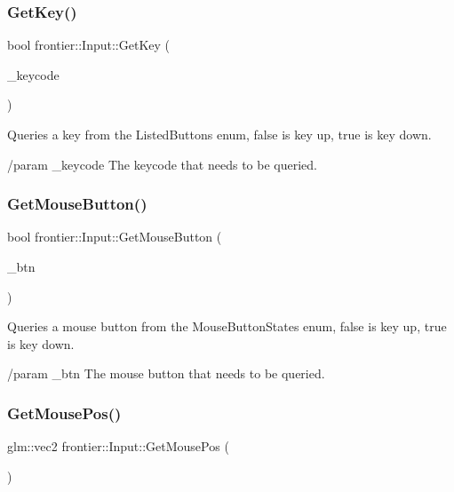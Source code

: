 \subsubsection{\texorpdfstring{Get\+Key()}{GetKey()}}
{\footnotesize\ttfamily bool frontier\+::\+Input\+::\+Get\+Key (\begin{DoxyParamCaption}\item[{\hyperlink{classfrontier_1_1_input_ada5b6b09af9c827bacee6fbc69015096}{Listed\+Buttons}}]{\+\_\+keycode }\end{DoxyParamCaption})}



Queries a key from the Listed\+Buttons enum, false is key up, true is key down. 

/param \+\_\+keycode The keycode that needs to be queried. \mbox{\label{classfrontier_1_1_input_ab7b944042e2bf83992b8347ea89a08c6}} 
\subsubsection{\texorpdfstring{Get\+Mouse\+Button()}{GetMouseButton()}}
{\footnotesize\ttfamily bool frontier\+::\+Input\+::\+Get\+Mouse\+Button (\begin{DoxyParamCaption}\item[{\hyperlink{classfrontier_1_1_input_ae78744e8c0799230bc6533be5d4b40f7}{Mouse\+Button\+States}}]{\+\_\+btn }\end{DoxyParamCaption})}



Queries a mouse button from the Mouse\+Button\+States enum, false is key up, true is key down. 

/param \+\_\+btn The mouse button that needs to be queried. \mbox{\label{classfrontier_1_1_input_a56ffa5acb487fd1e1b7afe45760606cd}} 
\subsubsection{\texorpdfstring{Get\+Mouse\+Pos()}{GetMousePos()}}
{\footnotesize\ttfamily glm\+::vec2 frontier\+::\+Input\+::\+Get\+Mouse\+Pos (\begin{DoxyParamCaption}{ }\end{DoxyParamCaption})}



